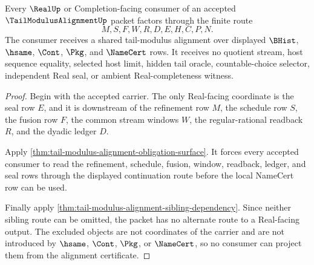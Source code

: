 \begin{theorem}
\label{thm:tail-modulus-alignment-nonescape}
Every $\RealUp$ or Completion-facing consumer of an accepted $\TailModulusAlignmentUp$ packet factors through the finite route
$$
M,S,F,W,R,D,E,H,C,P,N.
$$
The consumer receives a shared tail-modulus alignment over displayed $\BHist$, $\hsame$, $\Cont$, $\Pkg$, and $\NameCert$ rows. It receives no quotient stream, host sequence equality, selected host limit, hidden tail oracle, countable-choice selector, independent Real seal, or ambient Real-completeness witness.
\end{theorem}
\begin{proof}
Begin with the accepted carrier. The only Real-facing coordinate is the seal row $E$, and it is downstream of the refinement row $M$, the schedule row $S$, the fusion row $F$, the common stream windows $W$, the regular-rational readback $R$, and the dyadic ledger $D$.

Apply \autoref{thm:tail-modulus-alignment-obligation-surface}. It forces every accepted consumer to read the refinement, schedule, fusion, window, readback, ledger, and seal rows through the displayed continuation route before the local NameCert row can be used.

Finally apply \autoref{thm:tail-modulus-alignment-sibling-dependency}. Since neither sibling route can be omitted, the packet has no alternate route to a Real-facing output. The excluded objects are not coordinates of the carrier and are not introduced by $\hsame$, $\Cont$, $\Pkg$, or $\NameCert$, so no consumer can project them from the alignment certificate.
\end{proof}
